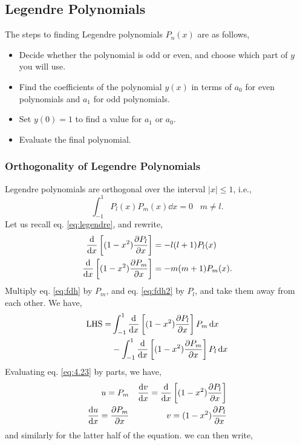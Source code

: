 \documentclass{book}
\begin{document}
\subsection{Legendre Polynomials}
The steps to finding Legendre polynomials $P_n(x)$ are as follows,
\begin{itemize}
	\item Decide whether the polynomial is odd or even, and choose which part of $y$ you will use.
	\item Find the coefficients of the polynomial $y(x)$ in terms of $a_0$ for even polynomials and $a_1$ for odd polynomials.
	\item Set $y(0) = 1$ to find a value for $a_1$ or $a_0$.
	\item Evaluate the final polynomial.
\end{itemize}
\subsubsection{Orthogonality of Legendre Polynomials}
Legendre polynomials are orthogonal over the interval $|x| \leq 1$, i.e.,
\begin{equation}
	\int_{-1}^{1} P_l(x) P_{m}(x) \dd{x} = 0 \hspace{10pt} m \neq l.
\end{equation}
Let us recall eq. \eqref{eq:legendre}, and rewrite,
\begin{align}
	\dv{x}\left[(1-x^2)\pdv{P_l}{x}\right]& = - l(l+1)P_l(x) \label{eq:fdh}\\
	\dv{x}\left[(1-x^2)\pdv{P_m}{x}\right]& = - m(m + 1)P_m(x). \label{eq:fdh2}
\end{align}
Multiply eq. \eqref{eq:fdh} by $P_m$, and eq. \eqref{eq:fdh2} by $P_l$, and take them away from each other. We have,
\begin{equation}
	\begin{split}
		\text{LHS} = & \int_{-1}^{1}\dv{x}\left[(1-x^2)\pdv{P_l}{x}\right]P_m\dd{x} \\
		& -\int_{-1}^{1}\dv{x}\left[(1-x^2)\pdv{P_m}{x}\right]P_l\dd{x}
	\end{split}\label{eq:4.23}
\end{equation}
Evaluating eq. \eqref{eq:4.23} by parts, we have,
	\begin{align}
		u = P_m && \dv{v}{x} = \dv{x}\left[(1-x^2)\pdv{P_l}{x}\right] \\
		\dv{u}{x} = \pdv{P_m}{x} && v = (1-x^2)\pdv{P_l}{x}
	\end{align}
and similarly for the latter half of the equation. we can then write,
\end{document}
